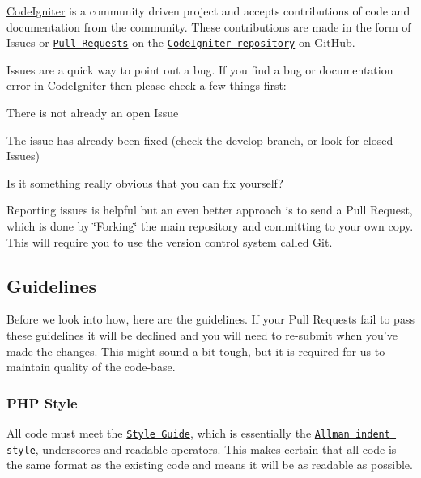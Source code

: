 \mbox{\hyperlink{namespace_code_igniter}{Code\+Igniter}} is a community driven project and accepts contributions of code and documentation from the community. These contributions are made in the form of Issues or \href{http://help.github.com/send-pull-requests/}{\tt Pull Requests} on the \href{https://github.com/bcit-ci/CodeIgniter}{\tt Code\+Igniter repository} on Git\+Hub.

Issues are a quick way to point out a bug. If you find a bug or documentation error in \mbox{\hyperlink{namespace_code_igniter}{Code\+Igniter}} then please check a few things first\+:


\begin{DoxyEnumerate}
\item There is not already an open Issue
\item The issue has already been fixed (check the develop branch, or look for closed Issues)
\item Is it something really obvious that you can fix yourself?
\end{DoxyEnumerate}

Reporting issues is helpful but an even better approach is to send a Pull Request, which is done by \char`\"{}\+Forking\char`\"{} the main repository and committing to your own copy. This will require you to use the version control system called Git.

\subsection*{Guidelines}

Before we look into how, here are the guidelines. If your Pull Requests fail to pass these guidelines it will be declined and you will need to re-\/submit when you’ve made the changes. This might sound a bit tough, but it is required for us to maintain quality of the code-\/base.

\subsubsection*{P\+HP Style}

All code must meet the \href{https://codeigniter.com/user_guide/general/styleguide.html}{\tt Style Guide}, which is essentially the \href{https://en.wikipedia.org/wiki/Indent_style#Allman_style}{\tt Allman indent style}, underscores and readable operators. This makes certain that all code is the same format as the existing code and means it will be as readable as possible.

